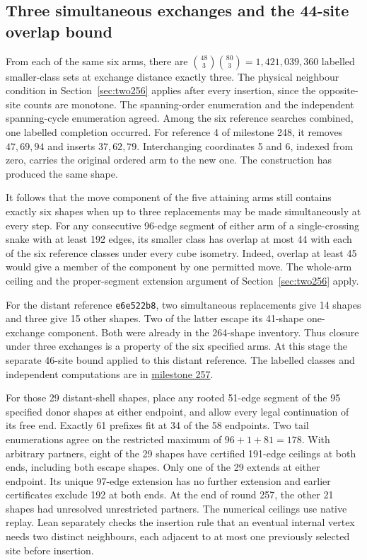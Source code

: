 \documentclass[11pt,a4paper]{article}
\theoremstyle{definition}
\theoremstyle{remark}
\begin{document}
\subsection{Three simultaneous exchanges and the 44-site overlap bound}
\label{sec:three257}
From each of the same six arms, there are
\(\binom{48}{3}\binom{80}{3}=1{,}421{,}039{,}360\) labelled
smaller-class sets at exchange distance exactly three. The physical
neighbour condition in Section~\ref{sec:two256} applies after every
insertion, since the opposite-site counts are monotone.
The spanning-order enumeration and the independent spanning-cycle
enumeration agreed. Among the six reference searches combined,
one labelled completion occurred. For reference 4 of milestone 248,
it removes \(47,69,94\) and inserts \(37,62,79\). Interchanging
coordinates 5 and 6, indexed from zero, carries the original ordered
arm to the new one. The construction has produced the same shape.

It follows that the move component of the five attaining arms still
contains exactly six shapes when up to three replacements may be made
simultaneously at every step. For any consecutive 96-edge segment of
either arm of a single-crossing snake with at least 192 edges, its
smaller class has overlap at most 44 with each of the six reference
classes under every cube isometry. Indeed, overlap at least 45 would
give a member of the component by one permitted move. The whole-arm
ceiling and the proper-segment extension argument of
Section~\ref{sec:two256} apply.

For the distant reference \texttt{e6e522b8}, two simultaneous
replacements give 14 shapes and three give 15 other shapes. Two of the
latter escape its 41-shape one-exchange component. Both were already
in the 264-shape inventory. Thus closure under three exchanges is a
property of the six specified arms. At this stage the separate 46-site bound
applied to this distant reference.
The labelled classes and independent computations are in
\href{https://github.com/hironaka-iori/Snake-in-the-box-in-9/tree/main/milestones/257-three-exchange-parents}{milestone 257}.

For those 29 distant-shell shapes, place any rooted 51-edge segment
of the 95 specified donor shapes at either endpoint, and allow every
legal continuation of its free end. Exactly 61 prefixes fit at 34 of
the 58 endpoints. Two tail enumerations agree on the restricted maximum
of \(96+1+81=178\). With arbitrary partners, eight of the 29 shapes
have certified 191-edge ceilings at both ends, including both escape
shapes. Only one of the 29 extends at either endpoint. Its unique
97-edge extension has no further extension and earlier certificates
exclude 192 at both ends. At the end of round 257, the other 21 shapes had unresolved
unrestricted partners. The numerical ceilings use native replay.
Lean separately checks the insertion rule that an eventual internal
vertex needs two distinct neighbours, each adjacent to at most one
previously selected site before insertion.
\end{document}
